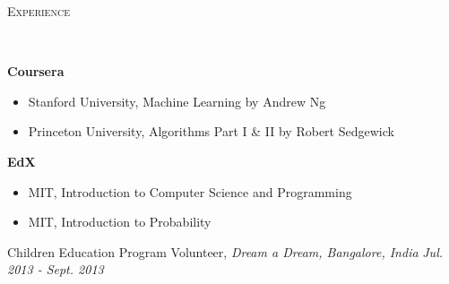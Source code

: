 \documentclass[a4paper]{article}
\newenvironment{changemargin}[2]{%
  \begin{list}{}{%
    \setlength{\topsep}{0pt}%
    \setlength{\leftmargin}{#1}%
    \setlength{\rightmargin}{#2}%
    \setlength{\listparindent}{\parindent}%
    \setlength{\itemindent}{\parindent}%
    \setlength{\parsep}{\parskip}%
  }%
  \item[]}{\end{list}
}
\newcommand{\lineover}{
	\begin{changemargin}{-0.05in}{-0.05in}
		\vspace*{-8pt}
		\hrulefill \\
		\vspace*{-2pt}
	\end{changemargin}
}
\newcommand{\header}[1]{
	\begin{changemargin}{-0.5in}{-0.5in}
		\scshape{#1}\\
  	\lineover
	\end{changemargin}
}
\newenvironment{body} {
	\vspace*{-16pt}
	\begin{changemargin}{-0.25in}{-0.5in}
  }	
	{\end{changemargin}
}
\begin{document}



\header{Experience}

\begin{body}
	\vspace{14pt}
	\textbf{Coursera}
	\begin{itemize}
	\itemsep 0pt
	\item Stanford University, Machine Learning by Andrew Ng
	\item Princeton University, Algorithms Part I \& II by Robert Sedgewick
	\end{itemize}
	\smallskip
	\textbf{EdX}
	\begin{itemize}
	\itemsep 0pt
	\item MIT, Introduction to Computer Science and Programming
	\item MIT, Introduction to Probability
	\end{itemize}
	\smallskip

	Children Education Program Volunteer, \emph{Dream a Dream, Bangalore, India} \hfill \emph{Jul. 2013 - Sept. 2013}\\
	\smallskip

\end{body}

\smallskip
\smallskip
\end{document}

